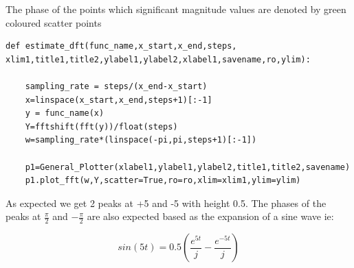 \documentclass{article}
\begin{document}
\noindent
The phase of the points which significant magnitude values are denoted by green coloured scatter points


\begin{lstlisting}
def estimate_dft(func_name,x_start,x_end,steps,
xlim1,title1,title2,ylabel1,ylabel2,xlabel1,savename,ro,ylim):
    
    sampling_rate = steps/(x_end-x_start)
    x=linspace(x_start,x_end,steps+1)[:-1]
    y = func_name(x)
    Y=fftshift(fft(y))/float(steps)
    w=sampling_rate*(linspace(-pi,pi,steps+1)[:-1])
    
    p1=General_Plotter(xlabel1,ylabel1,ylabel2,title1,title2,savename)
    p1.plot_fft(w,Y,scatter=True,ro=ro,xlim=xlim1,ylim=ylim)

\end{lstlisting}

As expected we get 2 peaks at +5 and -5 with height 0.5. 
The phases of the peaks at $\frac{\pi}{2}$ and $-\frac{\pi}{2}$ are also expected based as the expansion of a sine wave ie:

\begin{equation}
sin(5t) = 0.5(\frac{e^{5t}}{j}-\frac{e^{-5t}}{j})
\end{equation}
\end{document}
